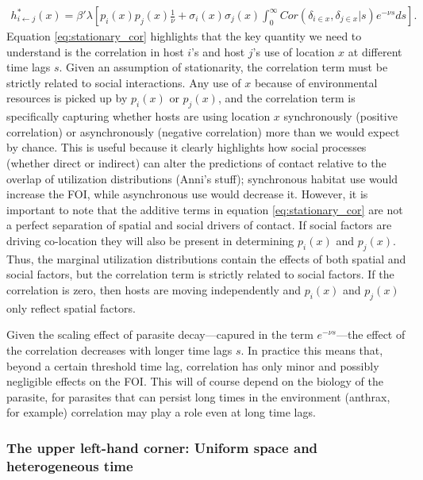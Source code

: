 \documentclass[letterpaper]{article}
\begin{document}
\begin{equation}
    \begin{aligned}
    h^*_{i \leftarrow j}(x) = \beta' \lambda \left[ p_i(x)p_j(x) \frac{1}{\nu} + \sigma_i(x) \sigma_j(x) \int_{0}^{\infty} Cor(\delta_{i \in x}, \delta_{j \in x} | s) e^{-\nu s} ds\right].
    \end{aligned}
    \label{eq:stationary_cor}
\end{equation}
Equation \ref{eq:stationary_cor} highlights that the key quantity we need to understand is the correlation in host $i$'s and host $j$'s use of location $x$ at different time lags $s$. Given an assumption of stationarity, the correlation term must be strictly related to social interactions.  Any use of $x$ because of environmental resources is picked up by $p_i(x)$ or $p_j(x)$, and the correlation term is specifically capturing whether hosts are using location $x$ synchronously (positive correlation) or asynchronously (negative correlation) more than we would expect by chance.  This is useful because it clearly highlights how social processes (whether direct or indirect) can alter the predictions of contact relative to the overlap of utilization distributions (Anni's stuff); synchronous habitat use would increase the FOI, while asynchronous use would decrease it. However, it is important to note that the additive terms in equation \ref{eq:stationary_cor} are not a perfect separation of spatial and social drivers of contact. If social factors are driving co-location they will also be present in determining $p_i(x)$ and $p_j(x)$. Thus, the marginal utilization distributions contain the effects of both spatial and social factors, but the correlation term is strictly related to social factors.  If the correlation is zero, then hosts are moving independently and $p_i(x)$ and $p_j(x)$ only reflect spatial factors.

Given the scaling effect of parasite decay---capured in the term $e^{-\nu s}$---the effect of the correlation decreases with longer time lags $s$. In practice this means that, beyond a certain threshold time lag, correlation has only minor and possibly negligible effects on the FOI. This will of course depend on the biology of the parasite, for parasites that can persist long times in the environment (anthrax, for example) correlation may play a role even at long time lags.

\subsubsection*{The upper left-hand corner: Uniform space and heterogeneous time}
\end{document}
